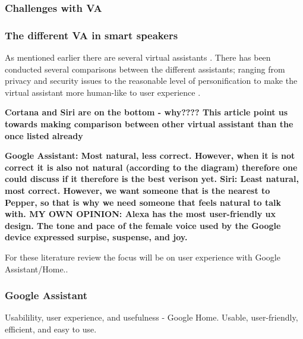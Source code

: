 \subsubsection{Challenges with VA}

\subsubsection{The different VA in smart speakers}
As mentioned earlier there are several virtual assistants \cite{hoy.m}. There has been conducted several comparisons between the different assistants; ranging from privacy and security issues \cite{hoy.m} to the reasonable level of personification \cite{Kaye.J} to make the virtual assistant more human-like \cite{Clark.L} to user experience \cite{hoy.m, Lopez.G, Berdasco.A, pyae.a, Kaye.J}. 


\textbf{Cortana and Siri are on the bottom - why???? 
This article point us towards making comparison between other virtual assistant than the once listed already} 
\cite{Berdasco.A}

\textbf{Google Assistant: Most natural, less correct. However, when it is not correct it is also not natural (according to the diagram) therefore one could discuss if it therefore is the best verison yet. 
Siri: Least natural, most correct. However, we want someone that is the nearest to Pepper, so that is why we need someone that feels natural to talk with. 
MY OWN OPINION: Alexa has the most user-friendly ux design. 
The tone and pace of the female voice used by the Google device expressed surpise, suspense, and joy. }
\cite{Lopez.G}


\cite{Kaye.J}


For these literature review the focus will be on user experience with Google Assistant/Home.. 


\subsubsection{Google Assistant}

Usabilility, user experience, and usefulness - Google Home. %
Usable, user-friendly, efficient, and easy to use. %

